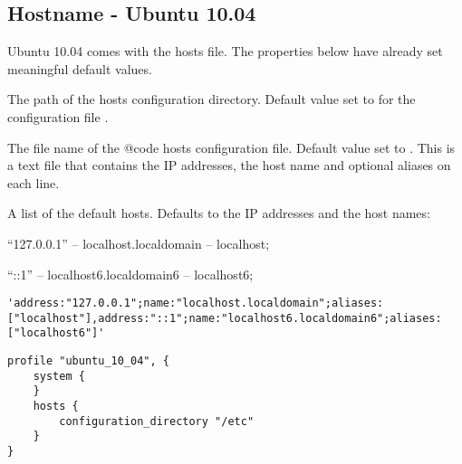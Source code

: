 \subsection{Hostname - Ubuntu 10.04}

Ubuntu 10.04 comes with the hosts file.
The properties below have already set meaningful default values.


The path of the hosts configuration directory.
Default value set to  for the configuration file .


The file name of the {@code hosts} configuration file.
Default value set to . This is a text file that contains 
the IP addresses, the host name and optional aliases on each line.


A list of the default hosts.
Defaults to the IP addresses and the host names:
\begin{compactitem}
\item ``127.0.0.1'' -- localhost.localdomain -- localhost;
\item ``::1'' -- localhost6.localdomain6 -- localhost6;
\end{compactitem}

\begin{lstlisting}[style=numbers,
label={lst:hosts_ubuntu_default_hosts},
title={Default Ubuntu 10.04 hosts}]
'address:"127.0.0.1";name:"localhost.localdomain";aliases:["localhost"],address:"::1";name:"localhost6.localdomain6";aliases:["localhost6"]'
\end{lstlisting}

\begin{lstlisting}[style=Sscontrol,
label={lst:hosts_ubuntu_profile},
title={Ubuntu hostname profile.}]
profile "ubuntu_10_04", {
    system {
    }
    hosts {
        configuration_directory "/etc"
    }
}
\end{lstlisting}

